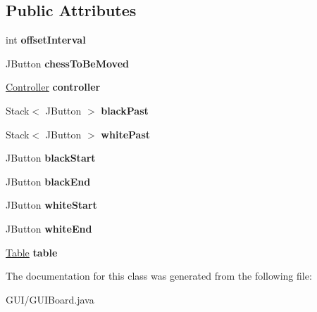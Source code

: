 \subsection*{Public Attributes}
\begin{DoxyCompactItemize}
\item 
\mbox{\label{class_g_u_i_1_1_g_u_i_board_a4249ff44b1425772cd7745daa8a65502}} 
int {\bfseries offset\+Interval}
\item 
\mbox{\label{class_g_u_i_1_1_g_u_i_board_a58264f7aadfc39c69c895d8eb8ec785a}} 
J\+Button {\bfseries chess\+To\+Be\+Moved}
\item 
\mbox{\label{class_g_u_i_1_1_g_u_i_board_aff10adcc6704200b4c99ec555ac5d2b7}} 
\mbox{\hyperlink{classcontroller_1_1_controller}{Controller}} {\bfseries controller}
\item 
\mbox{\label{class_g_u_i_1_1_g_u_i_board_a90cb8a48e91297887da1f7a4d662379d}} 
Stack$<$ J\+Button $>$ {\bfseries black\+Past}
\item 
\mbox{\label{class_g_u_i_1_1_g_u_i_board_a62c92e6bcb1af75e736430618eed1044}} 
Stack$<$ J\+Button $>$ {\bfseries white\+Past}
\item 
\mbox{\label{class_g_u_i_1_1_g_u_i_board_ade0e86075ec61020a8fdbe82a196b1f8}} 
J\+Button {\bfseries black\+Start}
\item 
\mbox{\label{class_g_u_i_1_1_g_u_i_board_a372138442699ff3637eabdc2cd91a41a}} 
J\+Button {\bfseries black\+End}
\item 
\mbox{\label{class_g_u_i_1_1_g_u_i_board_a6763993686c9cffa1eb91bd125eef9b1}} 
J\+Button {\bfseries white\+Start}
\item 
\mbox{\label{class_g_u_i_1_1_g_u_i_board_a6235dad380ee6ce06d2ed15dadd5ee9a}} 
J\+Button {\bfseries white\+End}
\item 
\mbox{\label{class_g_u_i_1_1_g_u_i_board_a80bc71dfcf0e8e4e13d28c8eb4e17ae7}} 
\mbox{\hyperlink{class_g_u_i_1_1_g_u_i_board_1_1_table}{Table}} {\bfseries table}
\end{DoxyCompactItemize}


The documentation for this class was generated from the following file\+:\begin{DoxyCompactItemize}
\item 
G\+U\+I/G\+U\+I\+Board.\+java\end{DoxyCompactItemize}
